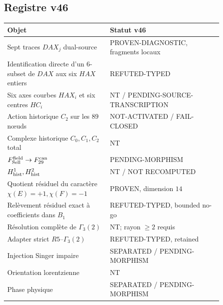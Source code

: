 \documentclass[11pt,a4paper]{article}
\begin{document}
\subsection{Registre v46}
\begin{center}
\begin{tabular}{p{0.42\linewidth}p{0.46\linewidth}}
\toprule
Objet & Statut v46\\
\midrule
Sept traces $DAX_j$ dual-source & PROVEN-DIAGNOSTIC, fragments locaux\\
Identification directe d'un $6$-subset de $DAX$ aux six $HAX$ entiers & REFUTED-TYPED\\
Six axes courbes $HAX_i$ et six centres $HC_i$ & NT / PENDING-SOURCE-TRANSCRIPTION\\
Action historique $C_2$ sur les $89$ nœuds & NOT-ACTIVATED / FAIL-CLOSED\\
Complexe historique $C_0,C_1,C_2$ total & NT\\
$F_{\rm Sell}^{\rm field}\to F_{29}^{\rm can}$ & PENDING-MORPHISM\\
$H^1_{\rm hist},H^2_{\rm hist}$ & NT / NOT RECOMPUTED\\
Quotient résiduel du caractère $\chi(E)=+1,\chi(F)=-1$ & PROVEN, dimension $14$\\
Relèvement résiduel exact à coefficients dans $B_1$ & REFUTED-TYPED, bounded no-go\\
Résolution complète de $\Gamma_3(2)$ & NT; rayon $\ge2$ requis\\
Adapter strict $R5$--$\Gamma_3(2)$ & REFUTED-TYPED, retained\\
Injection Singer impaire & SEPARATED / PENDING-MORPHISM\\
Orientation lorentzienne & NT\\
Phase physique & SEPARATED / PENDING-MORPHISM\\
\bottomrule
\end{tabular}
\end{center}
\end{document}
